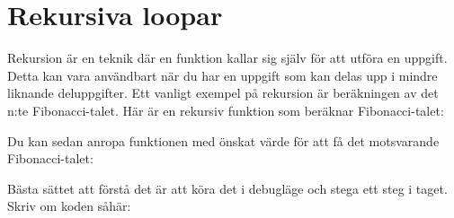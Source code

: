 \hypertarget{rekursiva-loopar}{%
\section{Rekursiva loopar}\label{rekursiva-loopar}}

Rekursion är en teknik där en funktion kallar sig själv för att utföra
en uppgift. Detta kan vara användbart när du har en uppgift som kan
delas upp i mindre liknande deluppgifter. Ett vanligt exempel på
rekursion är beräkningen av det n:te Fibonacci-talet. Här är en rekursiv
funktion som beräknar Fibonacci-talet:

\hypertarget{cb1}{}
\begin{Shaded}
\begin{Highlighting}[]
 \OperatorTok{(}\OperatorTok{)} \OperatorTok{\{}
     \OperatorTok{(}\OperatorTok{\textless{}=} \OperatorTok{)}
        \OperatorTok{;}
         \OperatorTok{(}\OperatorTok{{-}} \OperatorTok{)} \OperatorTok{+} \OperatorTok{(}\OperatorTok{{-}} \OperatorTok{);}
\end{Highlighting}
\end{Shaded}

Du kan sedan anropa funktionen med önskat värde för att få det
motsvarande Fibonacci-talet:

\hypertarget{cb2}{}
\begin{Shaded}
\begin{Highlighting}[]
\OperatorTok{=} \OperatorTok{(}\OperatorTok{);}
\OperatorTok{(}\OperatorTok{);} 
\end{Highlighting}
\end{Shaded}

Bästa sättet att förstå det är att köra det i debugläge och stega ett
steg i taget. Skriv om koden såhär:

\hypertarget{cb3}{}
\begin{Shaded}
\begin{Highlighting}[]
 \OperatorTok{(}\OperatorTok{)} \OperatorTok{\{}
     \OperatorTok{(}\OperatorTok{\textless{}=} \OperatorTok{)}
        \OperatorTok{;}
            \OperatorTok{(}\OperatorTok{{-}} \OperatorTok{)} \OperatorTok{+}
            \OperatorTok{(}\OperatorTok{{-}} \OperatorTok{);}
\OperatorTok{\}}
\end{Highlighting}
\end{Shaded}

